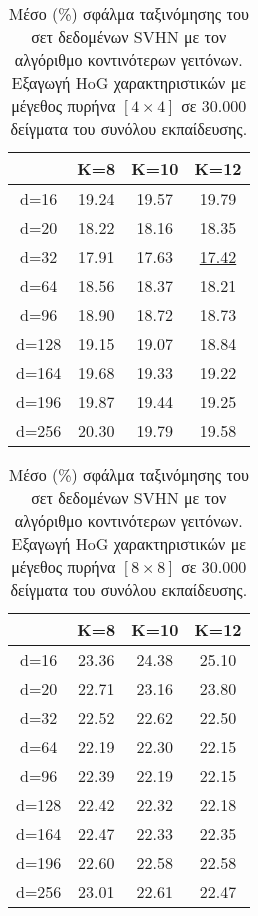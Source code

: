 \begin{table}[H]
\singlespacing
\centering
\label{tab:table12}
\caption{Μέσο (\%) σφάλμα ταξινόμησης του σετ δεδομένων \textlatin{SVHN} με τον αλγόριθμο κοντινότερων γειτόνων. Εξαγωγή \textlatin{HoG} χαρακτηριστικών με μέγεθος πυρήνα $[4\times4]$ σε 30.000 δείγματα του συνόλου εκπαίδευσης. }
\vspace*{5mm}
\begin{tabular}{|c|c|c|c|}
\hline
 & K=8 & K=10 & K=12 \\
\hline
d=16 & 19.24 & 19.57 & 19.79 \\
d=20 & 18.22 & 18.16 & 18.35 \\
d=32 & 17.91 & 17.63 & \underline{17.42} \\
d=64 & 18.56 & 18.37 & 18.21 \\
d=96 & 18.90 & 18.72 & 18.73 \\
d=128 & 19.15 & 19.07 & 18.84 \\
d=164 & 19.68 & 19.33 & 19.22 \\
d=196 & 19.87 & 19.44 & 19.25 \\
d=256 & 20.30 & 19.79 & 19.58 \\
\hline
\end{tabular}
\end{table}

\begin{table}[H]
\singlespacing
\centering
\label{tab:table13}
\caption{Μέσο (\%) σφάλμα ταξινόμησης του σετ δεδομένων \textlatin{SVHN} με τον αλγόριθμο κοντινότερων γειτόνων. Εξαγωγή \textlatin{HoG} χαρακτηριστικών με μέγεθος πυρήνα $[8\times8]$ σε 30.000 δείγματα του συνόλου εκπαίδευσης. }
\vspace*{5mm}
\begin{tabular}{|c|c|c|c|}
\hline
 & K=8 & K=10 & K=12 \\
\hline
d=16 & 23.36 & 24.38 & 25.10 \\
d=20 & 22.71 & 23.16 & 23.80 \\
d=32 & 22.52 & 22.62 & 22.50 \\
d=64 & 22.19 & 22.30 & 22.15 \\
d=96 & 22.39 & 22.19 & 22.15 \\
d=128 & 22.42 & 22.32 & 22.18 \\
d=164 & 22.47 & 22.33 & 22.35 \\
d=196 & 22.60 & 22.58 & 22.58 \\
d=256 & 23.01 & 22.61 & 22.47 \\
\hline
\end{tabular}
\end{table}

